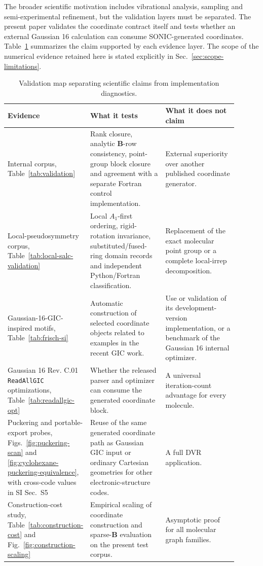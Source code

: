 \documentclass[journal=jctcce,manuscript=article,layout=traditional]{achemso}
\newcommand{\SONIC}{SONIC}
\newcommand{\Bmat}{\mathbf{B}}
\theoremstyle{definition}
\begin{document}
The broader scientific motivation includes vibrational analysis, sampling and
semi-experimental refinement, but the validation layers must be separated.  The
present paper validates the coordinate contract itself and tests whether an
external Gaussian 16 calculation can consume \SONIC{}-generated coordinates.
Table~\ref{tab:validation-map} summarizes the claim supported by each evidence
layer.  The scope of the numerical evidence retained here is stated explicitly in
Sec.~\ref{sec:scope-limitations}.

\begin{table}[htbp]
\centering
\scriptsize
\setlength{\tabcolsep}{3pt}
\renewcommand{\arraystretch}{0.95}
\caption{Validation map separating scientific claims from implementation
diagnostics.}
\label{tab:validation-map}
\begin{tabular}{@{}p{0.23\linewidth}p{0.34\linewidth}p{0.33\linewidth}@{}}
\toprule
Evidence & What it tests & What it does not claim \\
\midrule
Internal corpus, Table~\ref{tab:validation} & Rank closure, analytic
\(\Bmat\)-row consistency, point-group block closure and agreement with a
separate Fortran control implementation. & External superiority over another
published coordinate generator. \\
\midrule
Local-pseudosymmetry corpus, Table~\ref{tab:local-salc-validation} & Local
\(A_1\)-first ordering, rigid-rotation invariance, substituted/fused-ring domain
records and independent Python/Fortran classification. & Replacement of the
exact molecular point group or a complete local-irrep decomposition. \\
\midrule
Gaussian-16-GIC-inspired motifs, Table~\ref{tab:frisch-si} & Automatic
construction of selected coordinate objects related to examples in the recent
GIC work. & Use or validation of its development-version implementation, or a
benchmark of the Gaussian 16 internal optimizer. \\
\midrule
Gaussian 16 Rev. C.01 \texttt{ReadAllGIC} optimizations,
Table~\ref{tab:readallgic-opt} & Whether the released parser and optimizer can consume the generated
coordinate block. & A universal iteration-count advantage for every molecule. \\
\midrule
Puckering and portable-export probes, Figs.~\ref{fig:puckering-scan} and
\ref{fig:cyclohexane-puckering-equivalence}, with cross-code values in SI Sec.~S5 & Reuse of
the same generated coordinate path as Gaussian GIC input or ordinary Cartesian
geometries for other electronic-structure codes. & A full DVR application. \\
\midrule
Construction-cost study, Table~\ref{tab:construction-cost} and
Fig.~\ref{fig:construction-scaling} & Empirical scaling of coordinate
construction and sparse-\(\Bmat\) evaluation on the present test corpus. &
Asymptotic proof for all molecular graph families. \\
\bottomrule
\end{tabular}
\end{table}
\end{document}
